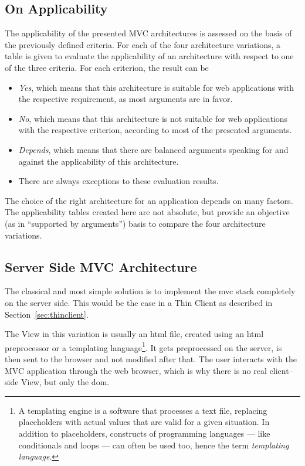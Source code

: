 \subsection*{On Applicability}
The applicability of the presented MVC architectures is assessed on the basis of the previously defined criteria. For each of the four architecture variations, a table is given to evaluate the applicability of an architecture with respect to one of the three criteria. For each criterion, the result can be
\begin{itemize}
	\item \emph{Yes}, which means that this architecture is suitable for web applications with the respective requirement, as most arguments are in favor.
	\item \emph{No}, which means that this architecture is not suitable for web applications with the respective criterion, according to most of the presented arguments.
	\item \emph{Depends}, which means that there are balanced arguments speaking for and against the applicability of this architecture.
  \item There are always exceptions to these evaluation results.
\end{itemize}

The choice of the right architecture for an application depends on many factors. The applicability tables created here are not absolute, but provide an objective (as in ``supported by arguments'') basis to compare the four architecture variations.


\subsection{Server Side MVC Architecture}
\label{sec:thinclientmvc}
The classical and most simple solution is to implement the \ac{mvc} stack completely on the server side. This would be the case in a Thin Client as described in Section~\ref{sec:thinclient}.

The View in this variation is usually an \ac{html} file, created using an \ac{html} preprocessor or a templating language\footnote{A templating engine is a software that processes a text file, replacing placeholders with actual values that are valid for a given situation. In addition to placeholders, constructs of programming languages --- like conditionals and loops --- can often be used too, hence the term \emph{templating language}.}. It gets preprocessed on the server, is then sent to the browser and not modified after that. The user interacts with the MVC application through the web browser, which is why there is no real client--side View, but only the \ac{dom}.

